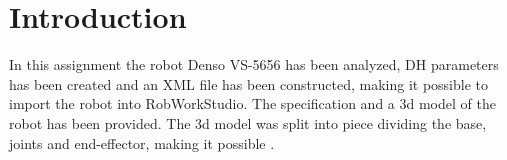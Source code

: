 \section{Introduction}

In this assignment the robot Denso VS-5656 has been analyzed, DH parameters has been created and an XML file has been constructed, making it possible to import the robot into RobWorkStudio. The specification and a 3d model of the robot has been provided. The 3d model was split into piece dividing the base, joints and end-effector, making it possible .
